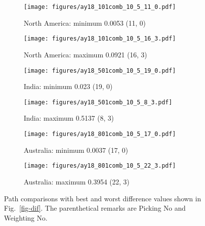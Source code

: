 \begin{figure*}
	\centering
	\begin{subfigure}{.42\textwidth} %
		\texttt{[image: figures/ay18\_101comb\_10\_5\_11\_0.pdf]}
		\caption{North America: minimum 0.0053 (11, 0)}\label{fig-nac-105110}
	\end{subfigure}
	\begin{subfigure}{.42\textwidth} %
		\texttt{[image: figures/ay18\_101comb\_10\_5\_16\_3.pdf]}
		\caption{North America: maximum 0.0921 (16, 3)}\label{fig-nac-105163}
	\end{subfigure}
	\vspace{.1em}
	\begin{subfigure}{.42\textwidth}
		\texttt{[image: figures/ay18\_501comb\_10\_5\_19\_0.pdf]}
		\caption{India: minimum 0.023 (19, 0)}\label{fig-ind-105190}
	\end{subfigure}
	\begin{subfigure}{.42\textwidth}
		\texttt{[image: figures/ay18\_501comb\_10\_5\_8\_3.pdf]}
		\caption{India: maximum 0.5137 (8, 3)}\label{fig-ind-10583}
	\end{subfigure}
	\vspace{.1em}
	\begin{subfigure}{.42\textwidth}
		\texttt{[image: figures/ay18\_801comb\_10\_5\_17\_0.pdf]}
		\caption{Australia: minimum 0.0037 (17, 0)}\label{fig-au-105170}
	\end{subfigure}
	\begin{subfigure}{.42\textwidth}
		\texttt{[image: figures/ay18\_801comb\_10\_5\_22\_3.pdf]}
		\caption{Australia: maximum 0.3954 (22, 3)}\label{fig-au-105223}
	\end{subfigure}
	\caption[Best and worst differences (10 Myr bin, 5 Myr
step)]{Path comparisons with best and worst difference values shown in
Fig.~\ref{fig-dif}. The parenthetical remarks are Picking No and Weighting No.}\label{fig-difbw}
\end{figure*}


